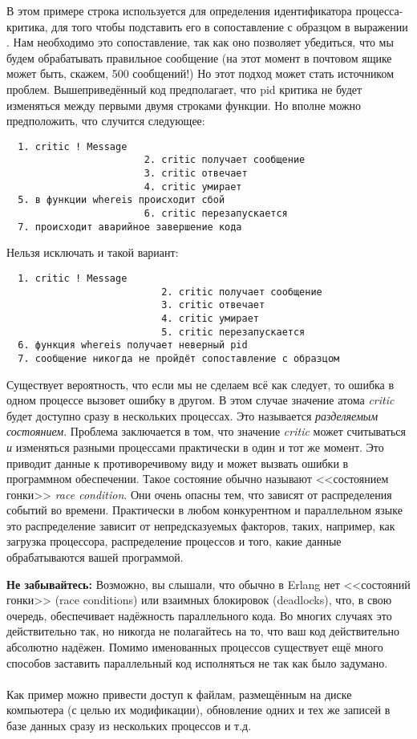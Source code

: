 В этом примере строка  используется для определения идентификатора процесса\--критика, для того чтобы подставить его в сопоставление с образцом в выражении .
Нам необходимо это сопоставление, так как оно позволяет убедиться, что мы будем обрабатывать правильное сообщение (на этот момент в почтовом ящике может быть, скажем, 500 сообщений!)
Но этот подход может стать источником проблем.
Вышеприведённый код предполагает, что pid критика не будет изменяться между первыми двумя строками функции.
Но вполне можно предположить, что случится следующее:
\begin{verbatim}
  1. critic ! Message
                        2. critic получает сообщение
                        3. critic отвечает
                        4. critic умирает
  5. в функции whereis происходит сбой
                        6. critic перезапускается
  7. происходит аварийное завершение кода
\end{verbatim}

Нельзя исключать и такой вариант:
\begin{verbatim}
  1. critic ! Message
                           2. critic получает сообщение
                           3. critic отвечает
                           4. critic умирает
                           5. critic перезапускается
  6. функция whereis получает неверный pid
  7. сообщение никогда не пройдёт сопоставление с образцом
\end{verbatim}

Существует вероятность, что если мы не сделаем всё как следует, то ошибка в одном процессе вызовет ошибку в другом.
В этом случае значение атома \emph{critic} будет доступно  сразу в нескольких процессах.
Это называется \emph{разделяемым состоянием}.
Проблема заключается в том, что значение \emph{critic} может считываться \emph{и} изменяться разными процессами практически в один и тот же момент.
Это приводит данные к противоречивому виду и может вызвать ошибки в программном обеспечении.
Такое состояние обычно называют <<состоянием гонки>> \emph{race condition}.
Они очень опасны тем, что зависят от распределения событий во времени.
Практически в любом конкурентном и параллельном языке это распределение зависит от непредсказуемых факторов, таких, например, как загрузка процессора, распределение процессов и того, какие данные обрабатываются вашей программой.\\
\colorbox{lorange}
{
\begin{minipage}{1.0\linewidth}
    \textbf{Не забывайтесь:} 
Возможно, вы слышали, что обычно в Erlang нет <<состояний гонки>> (race conditions) или взаимных блокировок (deadlocks), что, в свою очередь, обеспечивает надёжность параллельного кода.
Во многих случаях это действительно так, но никогда не полагайтесь на то, что ваш код действительно абсолютно надёжен.
Помимо именованных процессов существует ещё много способов заставить параллельный код исполняться не так как было задумано.\\
\\
Как пример можно привести доступ к файлам, размещённым на диске компьютера (с целью их модификации), обновление одних и тех же записей в базе данных сразу из нескольких процессов и т.д.
\end{minipage}
}

